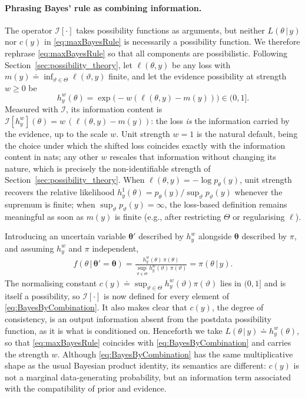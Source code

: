 \documentclass[accepted]{uai2026} %
\def\given{\,|\,}
\theoremstyle{remark}
\begin{document}
\paragraph{Phrasing Bayes' rule as combining information.} The operator
$\mathcal{I}[\cdot]$ takes possibility functions as arguments, but neither
$L(\theta \given y)$ nor $c(y)$ in \eqref{eq:maxBayesRule} is necessarily
a possibility function. We therefore rephrase \eqref{eq:maxBayesRule} so that all
components are possibilistic. Following Section~\ref{sec:possibility_theory}, let
$\ell(\theta, y)$ be any loss with $m(y) \doteq \inf_{\vartheta\in\Theta}
\ell(\vartheta,y)$ finite, and let the evidence possibility at strength $w\ge0$ be
\[
h_y^{w}(\theta) = \exp\big(-w(\ell(\theta, y)-m(y))\big)\in(0,1].
\]
Measured with $\mathcal I$, its information content is $\mathcal{I}[h_y^{w}](\theta) = w\,(\ell(\theta,y)-m(y))$: the loss \emph{is} the information carried by the evidence, up to the scale $w$. Unit strength $w=1$ is the natural default, being the choice under which the shifted loss coincides exactly with the information content in nats; any other $w$ rescales that information without changing its nature, which is precisely the non-identifiable strength of Section~\ref{sec:possibility_theory}. When $\ell(\theta, y)=-\log p_\theta(y)$, unit strength recovers the relative likelihood $h_y^{1}(\theta) = p_{\theta}(y)/\sup_{\vartheta} p_{\vartheta}(y)$ whenever the supremum is finite; when $\sup_{\vartheta} p_{\vartheta}(y)=\infty$, the loss-based definition remains meaningful as soon as $m(y)$ is finite (e.g., after restricting $\Theta$ or regularising $\ell$).

Introducing an uncertain variable $\bm{\theta}'$ described by $h_y^{w}$ alongside $\bm{\theta}$ described by $\pi$, and assuming $h_y^{w}$ and $\pi$ independent,
\begin{align}
\label{eq:BayesByCombination}
f(\theta \given \bm{\theta}' = \bm{\theta})
= \frac{h_y^{w}(\theta)\, \pi(\theta)}
       {\sup_{\vartheta \in \Theta} h_y^{w}(\vartheta)\, \pi(\vartheta)}
= \pi(\theta \given y).
\end{align}
The normalising constant $c(y) \doteq \sup_{\vartheta \in \Theta}
h_y^{w}(\vartheta) \pi(\vartheta)$ lies in $(0,1]$ and is itself a possibility, so $\mathcal{I}[\cdot]$ is now defined for every element of \eqref{eq:BayesByCombination}. It also makes clear that $c(y)$, the degree of consistency, is an output information absent from the postdata possibility function, as it is what is conditioned on. Henceforth we take $L(\theta \given y) \doteq h_y^{w}(\theta)$, so that \eqref{eq:maxBayesRule} coincides with \eqref{eq:BayesByCombination} and carries the strength $w$. Although \eqref{eq:BayesByCombination} has the same multiplicative shape as the usual Bayesian product identity, its semantics are different: $c(y)$ is not a marginal data-generating probability, but an information term associated with the compatibility of prior and evidence.
\end{document}

